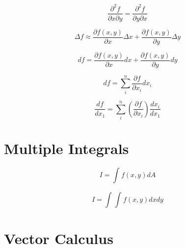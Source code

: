 \documentclass[]{report}
\begin{document}
\begin{equation*}
    \frac{\partial^{2}f}{\partial x \partial y} = \frac{\partial^{2}f}{\partial y \partial x}
\end{equation*}

\begin{equation*}
    \Delta f \approx \frac{\partial f(x, y)}{\partial x}\Delta x + \frac{\partial f(x, y)}{\partial y}\Delta y
\end{equation*}

\begin{equation*}
    df = \frac{\partial f(x, y)}{\partial x}dx + \frac{\partial f(x, y)}{\partial y}dy
\end{equation*}

\begin{equation*}
    df = \sum_{i}^{n}\frac{\partial f}{\partial x_{i}}dx_{i}
\end{equation*}

\begin{equation*}
    \frac{df}{dx_{1}} = \sum_{i}^{n}\left(\frac{\partial f}{\partial x_{i}}\right)\frac{dx_{i}}{dx_{1}}
\end{equation*}

\chapter{Multiple Integrals}

\begin{equation*}
    I = \int_{}^{}f(x,y)dA
\end{equation*}

\begin{equation*}
    I = \int_{}^{}\int_{}^{}f(x,y)dxdy
\end{equation*}

\chapter{Vector Calculus}
\end{document}
